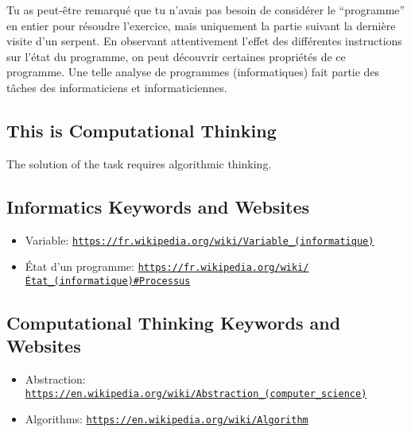 \documentclass[a4paper,11pt]{report}
\newcommand{\BrochureUrlText}[1]{\texttt{#1}}
\begin{document}
Tu as peut-être remarqué que tu n’avais pas besoin de considérer le “programme” en entier pour résoudre l’exercice, mais uniquement la partie suivant la dernière visite d’un serpent. En observant attentivement l’effet des différentes instructions sur l’état du programme, on peut découvrir certaines propriétés de ce programme. Une telle analyse de programmes (informatiques) fait partie des tâches des informaticiens et informaticiennes.


\subsection*{This is Computational Thinking}

The solution of the task requires algorithmic thinking.


\subsection*{Informatics Keywords and Websites}

\begin{itemize}
  \item Variable: \href{https://fr.wikipedia.org/wiki/Variable_(informatique)}{\BrochureUrlText{https://fr.wikipedia.org/wiki/Variable\_(informatique)}}
  \item État d’un programme: \href{https://fr.wikipedia.org/wiki/\%C3\%89tat_(informatique)\#Processus}{\BrochureUrlText{https://fr.wikipedia.org/wiki/État\_(informatique)\#Processus}}
\end{itemize}


\subsection*{Computational Thinking Keywords and Websites}

\begin{itemize}
  \item Abstraction: \href{https://en.wikipedia.org/wiki/Abstraction_(computer_science)}{\BrochureUrlText{https://en.wikipedia.org/wiki/Abstraction\_(computer\_science)}}
  \item Algorithms: \href{https://en.wikipedia.org/wiki/Algorithm}{\BrochureUrlText{https://en.wikipedia.org/wiki/Algorithm}}
\end{itemize}
\end{document}
